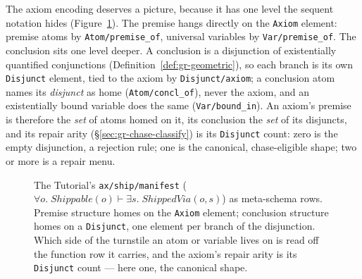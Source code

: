 The axiom encoding deserves a picture, because it has one level the
sequent notation hides (Figure~\ref{fig:gr-axiom-rows}). The premise
hangs directly on the \texttt{Axiom} element: premise atoms by
\texttt{Atom/premise\_of}, universal variables by
\texttt{Var/premise\_of}. The conclusion sits one level deeper. A
conclusion is a disjunction of existentially quantified conjunctions
(Definition~\ref{def:gr-geometric}), so each branch is its own
\texttt{Disjunct} element, tied to the axiom by
\texttt{Disjunct/axiom}; a conclusion atom names its
\emph{disjunct} as home (\texttt{Atom/concl\_of}), never the axiom,
and an existentially bound variable does the same
(\texttt{Var/bound\_in}). An axiom's premise is therefore the
\emph{set} of atoms homed on it, its conclusion the \emph{set} of its
disjuncts, and its repair arity (\S\ref{sec:gr-chase-classify}) is
its \texttt{Disjunct} count: zero is the empty disjunction, a
rejection rule; one is the canonical, chase-eligible shape; two or
more is a repair menu.

\begin{figure}
\centering
{}
\caption{The Tutorial's \texttt{ax/ship/manifest} ($\forall o.\;
\mathit{Shippable}(o) \vdash \exists s.\; \mathit{ShippedVia}(o,s)$)
as meta-schema rows. Premise structure homes on the \texttt{Axiom}
element; conclusion structure homes on a \texttt{Disjunct}, one
element per branch of the disjunction. Which side of the turnstile
an atom or variable lives on is read off the function row it
carries, and the axiom's repair arity is its \texttt{Disjunct}
count — here one, the canonical shape.}
\label{fig:gr-axiom-rows}
\end{figure}

